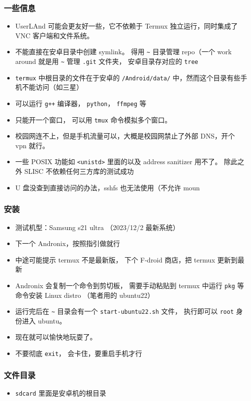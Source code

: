 

\begin{issues}
\issueDraft
\end{issues}

\subsubsection{一些信息}
\begin{itemize}
\item UserLAnd 可能会更友好一些，它不依赖于 Termux 独立运行，同时集成了 VNC 客户端和文件系统。
\item 不能直接在安卓目录中创建 symlink。 得用 \verb`~` 目录管理 repo（一个 work around 就是用 \verb`~` 管理 \verb`.git` 文件夹， 安卓目录存对应的 \verb`tree`
\item \verb`termux` 中根目录的文件在于安卓的 \verb`/Android/data/` 中，然而这个目录有些手机不能访问（如三星）
\item 可以运行 \verb`g++` 编译器， \verb`python`， \verb`ffmpeg` 等
\item 只能开一个窗口， 可以用 \verb`tmux` 命令模拟多个窗口。
\item 校园网连不上，但是手机流量可以，大概是校园网禁止了外部 DNS，开个 vpn 就行。
\item 一些 POSIX 功能如 \verb`<unistd>` 里面的以及 address sanitizer 用不了。 除此之外 SLISC 不依赖任何三方库的测试成功
\item U 盘没查到直接访问的办法，sshfs 也无法使用（不允许 moun
\end{itemize}

\subsubsection{安装}
\begin{itemize}
\item 测试机型：Samsung s21 ultra （2023/12/2 最新系统）
\item 下一个 Andronix，按照指引做就行
\item 中途可能提示 termux 不是最新版， 下个 F-droid 商店，把 termux 更新到最新
\item Andronix 会复制一个命令到剪切板， 需要手动粘贴到 termux 中运行 \verb`pkg` 等命令安装 Linux distro （笔者用的 ubuntu22）
\item 运行完后在 \verb`~` 目录会有一个 \verb`start-ubuntu22.sh` 文件， 执行即可以 \verb`root` 身份进入 ubuntu。
\item 现在就可以愉快地玩耍了。
\item 不要彻底 \verb`exit`， 会卡住，要重启手机才行
\end{itemize}

\subsubsection{文件目录}
\begin{itemize}
\item \verb`sdcard` 里面是安卓机的根目录
\end{itemize}
